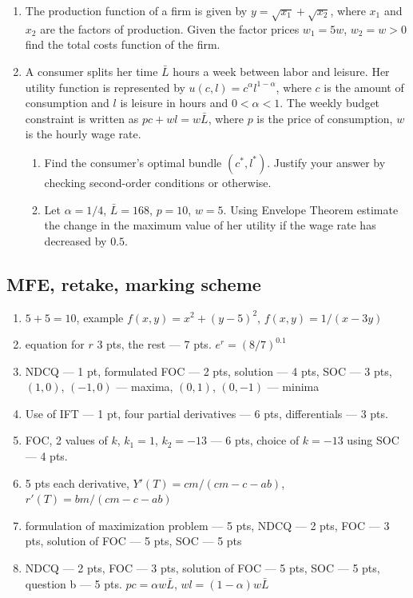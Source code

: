 \documentclass[12pt]{article} %
\theoremstyle{definition} %
\begin{document}
\begin{enumerate}[resume]
\item The production function of a firm is given by $y=\sqrt{x_1}+\sqrt{x_2}$, where $x_1$ and $x_2$ are the factors of production. Given the factor prices $w_1=5w$, $w_2=w>0$ find the total costs function of the firm.
\item A consumer splits her time $\bar{L}$ hours a week between labor and leisure. Her utility function is represented by $u(c,l)=c^{\alpha}l^{1-\alpha}$, where $c$ is the amount of consumption and $l$ is leisure in hours and $0<\alpha<1$. The weekly budget constraint is written as $pc+wl=w\bar{L}$,
where $p$ is the price of consumption, $w$ is the hourly wage rate.
\begin{enumerate}
\item Find the consumer’s optimal bundle $(c^*,l^*)$. Justify your answer by checking second-order conditions or otherwise.
\item Let $\alpha=1/4$, $\bar{L}=168$, $p=10$, $w=5$. Using Envelope Theorem estimate the change in the maximum value of her utility if the wage rate has decreased by $0.5$.
\end{enumerate}

\end{enumerate}

\subsection{MFE, retake, marking scheme}

\begin{enumerate}
\item $5+5=10$, example $f(x,y)=x^2+(y-5)^2$, $f(x,y)=1/(x-3y)$
\item equation for $r$ 3 pts, the rest --- 7 pts. $e^r=(8/7)^{0.1}$
\item NDCQ --- 1 pt, formulated FOC --- 2 pts, solution --- 4 pts, SOC --- 3 pts, $(1,0)$, $(-1,0)$ --- maxima, $(0,1)$, $(0,-1)$ --- minima
\item Use of IFT --- 1 pt, four partial derivatives --- 6 pts, differentials --- 3 pts.
\item FOC, 2 values of $k$, $k_1=1$, $k_2=-13$ --- 6 pts, choice of $k=-13$ using SOC --- 4 pts.
\item 5 pts each derivative, $Y'(T)=cm/(cm-c-ab)$, $r'(T)=bm/(cm-c-ab)$
\item formulation of maximization problem --- 5 pts, NDCQ --- 2 pts, FOC --- 3 pts, solution of FOC --- 5 pts, SOC --- 5 pts
\item  NDCQ --- 2 pts, FOC --- 3 pts, solution of FOC --- 5 pts, SOC --- 5 pts, question b --- 5 pts. $pc=\alpha w\bar{L}$, $wl=(1-\alpha)w\bar{L}$
\end{enumerate}
\end{document}
